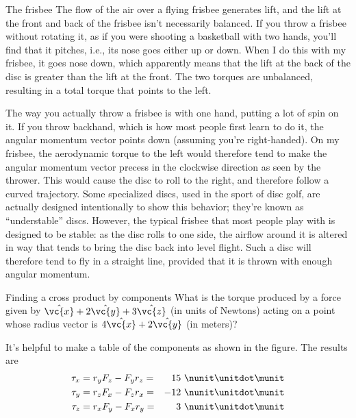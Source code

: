 \begin{eg}{The frisbee}
The flow of the air over a flying frisbee generates lift, and the lift
at the front and back of the frisbee isn't necessarily balanced.
If you throw a frisbee without rotating it, as if you were
shooting a basketball with two hands, you'll find that it
pitches, i.e., its nose goes either up or down. When I do this
with my frisbee, it goes nose down, which apparently means
that the lift at the back of the disc is greater than the lift at
the front. The two torques are unbalanced, resulting in a total
torque that points to the left.

The way you actually throw a frisbee is with one hand, putting a lot
of spin on it. If you throw backhand, which is how most people first
learn to do it, the angular momentum vector points down (assuming you're right-handed). On my
frisbee, the aerodynamic torque to the left would therefore tend
to make the angular momentum vector precess in the clockwise direction
as seen by the thrower. This would cause the disc to roll to the right,
and therefore follow a curved trajectory. Some specialized discs, used in the
sport of disc golf, are actually designed intentionally to show this behavior;
they're known as ``understable'' discs. However, the typical frisbee that most
people play with is designed to be stable: as the disc rolls to one side, the airflow
around it is altered in way that tends to bring the disc back into level flight. Such
a disc will therefore tend to fly in a straight line, provided that it is thrown
with enough angular momentum.
\end{eg}

\begin{eg}{Finding a cross product by components}\label{eg:xprodcomps}
\egquestion
What is the torque produced by a force given by
$\hat{\vc{x}}+2\hat{\vc{y}}+3\hat{\vc{z}}$
 (in units of Newtons) acting on a point whose radius
vector is $4\hat{\vc{x}}+2\hat{\vc{y}}$ (in meters)?

\eganswer
It's helpful to make a table of the components as
shown in the figure. The results are
\begin{alignat*}{2}
        \tau_x        &=   r_{y} F_{z} -  F_y r_{z} 
                        =&  15\ \nunit\unitdot\munit        \\
        \tau_y        &=   r_{z} F_x -  F_{z} r_{x} 
                        =&  - 12\ \nunit\unitdot\munit        \\
        \tau_z        &=   r_x F_{y} -  F_{x} r_y 
                        =&   3\ \nunit\unitdot\munit
\end{alignat*}
\end{eg}

